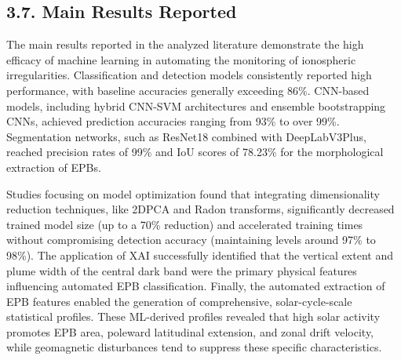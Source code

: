 \hypertarget{main-results-reported}{%
\subsection{3.7. Main Results Reported}\label{main-results-reported}}

The main results reported in the analyzed literature demonstrate the
high efficacy of machine learning in automating the monitoring of
ionospheric irregularities. Classification and detection models
consistently reported high performance, with baseline accuracies
generally exceeding 86\%. CNN-based models, including hybrid CNN-SVM
architectures and ensemble bootstrapping CNNs, achieved prediction
accuracies ranging from 93\% to over 99\%. Segmentation networks, such
as ResNet18 combined with DeepLabV3Plus, reached precision rates of 99\%
and IoU scores of 78.23\% for the morphological extraction of EPBs.

Studies focusing on model optimization found that integrating
dimensionality reduction techniques, like 2DPCA and Radon transforms,
significantly decreased trained model size (up to a 70\% reduction) and
accelerated training times without compromising detection accuracy
(maintaining levels around 97\% to 98\%). The application of XAI
successfully identified that the vertical extent and plume width of the
central dark band were the primary physical features influencing
automated EPB classification. Finally, the automated extraction of EPB
features enabled the generation of comprehensive, solar-cycle-scale
statistical profiles. These ML-derived profiles revealed that high solar
activity promotes EPB area, poleward latitudinal extension, and zonal
drift velocity, while geomagnetic disturbances tend to suppress these
specific characteristics.
